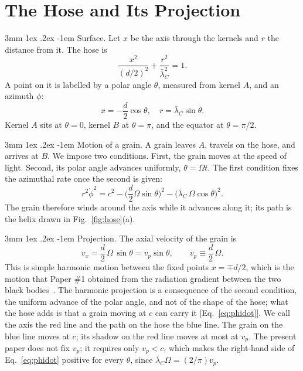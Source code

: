 \documentclass[%
 reprint, amsmath,amssymb, aps, prb, ]{revtex4-2}
\makeatletter
\numberwithin{equation}{section}
\renewcommand\paragraph{%
  \@startsection{paragraph}{4}{\z@}%
    {3mm \@plus 1ex \@minus .2ex}%
    {-1em}%
    {\normalfont\normalsize\itshape}}
\newcommand{\lbar}{\bar{\lambda}_C}
\makeatother
\begin{document}
\section{The Hose and Its Projection}
\label{sec:hose}

\paragraph{Surface.} Let $x$ be the axis through the kernels and $r$ the distance from it. The hose is
\begin{equation}
\frac{x^2}{(d/2)^2} + \frac{r^2}{\lbar^2} = 1.
\label{eq:spheroid}
\end{equation}
A point on it is labelled by a polar angle $\theta$, measured from kernel $A$, and an azimuth $\phi$:
\begin{equation}
x = -\frac{d}{2}\cos\theta,\quad
r = \lbar\sin\theta .
\label{eq:param}
\end{equation}
Kernel $A$ sits at $\theta = 0$, kernel $B$ at $\theta = \pi$, and the equator at $\theta = \pi/2$.

\paragraph{Motion of a grain.} A grain leaves $A$, travels on the hose, and arrives at $B$. We impose two conditions. First, the grain moves at the speed of light. Second, its polar angle advances uniformly, $\theta = \Omega t$. The first condition fixes the azimuthal rate once the second is given:
\begin{equation}
r^2\dot\phi^2 = c^2 - \Big(\frac{d}{2}\Omega\sin\theta\Big)^2 - \big(\lbar\,\Omega\cos\theta\big)^2 .
\label{eq:phidot}
\end{equation}
The grain therefore winds around the axis while it advances along it; its path is the helix drawn in Fig.~\ref{fig:hose}(a).

\paragraph{Projection.} The axial velocity of the grain is
\begin{equation}
v_x = \frac{d}{2}\,\Omega\,\sin\theta = v_p \sin\theta, \qquad v_p \equiv \frac{d}{2}\,\Omega .
\label{eq:vx}
\end{equation}
This is simple harmonic motion between the fixed points $x = \mp d/2$, which is the motion that Paper \#1 obtained from the radiation gradient between the two black bodies~\cite{H01}. The harmonic projection is a consequence of the second condition, the uniform advance of the polar angle, and not of the shape of the hose; what the hose adds is that a grain moving at $c$ can carry it [Eq.~\eqref{eq:phidot}]. We call the axis the red line and the path on the hose the blue line. The grain on the blue line moves at $c$; its shadow on the red line moves at most at $v_p$. The present paper does not fix $v_p$; it requires only $v_p < c$, which makes the right-hand side of Eq.~\eqref{eq:phidot} positive for every $\theta$, since $\lbar\Omega = (2/\pi)v_p$.
\end{document}
